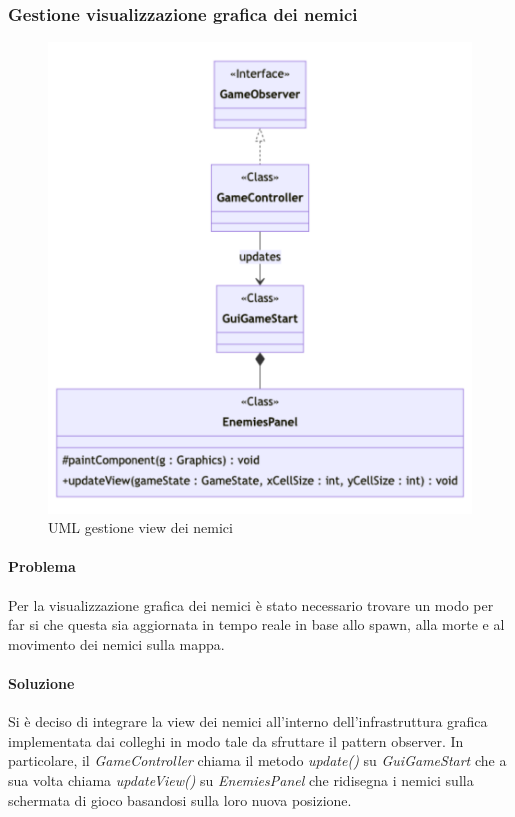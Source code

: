\documentclass[a4paper,12pt]{report}
\begin{document}
\subsubsection{Gestione visualizzazione grafica dei nemici}

\begin{figure}[H]
    \centering
    \includegraphics[scale=0.3]{RelazioneTD/images/enemiesViewUML.png}
    \caption{UML gestione view dei nemici}
    \label{fig:enter-label}
\end{figure}

\paragraph{Problema} Per la visualizzazione grafica dei nemici è stato necessario trovare un modo per far si che questa sia aggiornata in tempo reale in base allo spawn, alla morte e al movimento dei nemici sulla mappa.

\paragraph{Soluzione} Si è deciso di integrare la view dei nemici all'interno dell'infrastruttura grafica implementata dai colleghi in modo tale da sfruttare il pattern observer. In particolare, il \textit{GameController} chiama il metodo \textit{update()} su \textit{GuiGameStart} che a sua volta chiama \textit{updateView()} su \textit{EnemiesPanel} che ridisegna i nemici sulla schermata di gioco basandosi sulla loro nuova posizione.
\end{document}
